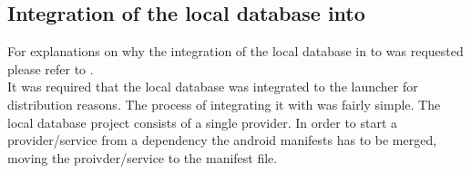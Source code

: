\subsection{Integration of the local database into \launcher}
\label{sec:developments:localdbtolauncher}
For explanations on why the integration of the local database in to \launcher was requested please refer to .\\

It was required that the local database was integrated to the launcher for distribution reasons.
The process of integrating it with \launcher was fairly simple.  The local database project consists of a single provider.
In order to start a provider/service from a dependency the android manifests has to be merged, moving the proivder/service to the \launcher manifest file.